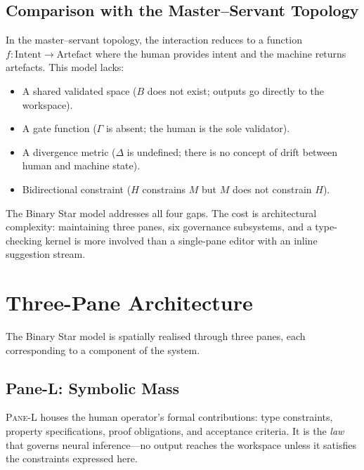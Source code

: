 \documentclass[11pt,a4paper]{article}
\newcommand{\paneL}{\textsc{Pane-L}}
\begin{document}
\subsection{Comparison with the Master--Servant Topology}

In the master--servant topology, the interaction reduces to a
function $f: \text{Intent} \to \text{Artefact}$ where the human
provides intent and the machine returns artefacts. This model
lacks:

\begin{itemize}
  \item A shared validated space ($B$ does not exist; outputs go
    directly to the workspace).
  \item A gate function ($\Gamma$ is absent; the human is the sole
    validator).
  \item A divergence metric ($\Delta$ is undefined; there is no
    concept of drift between human and machine state).
  \item Bidirectional constraint ($H$ constrains $M$ but $M$ does
    not constrain $H$).
\end{itemize}

The Binary Star model addresses all four gaps. The cost is
architectural complexity: maintaining three panes, six governance
subsystems, and a type-checking kernel is more involved than a
single-pane editor with an inline suggestion stream.

\section{Three-Pane Architecture}\label{sec:three-pane}

The Binary Star model is spatially realised through three panes,
each corresponding to a component of the system.

\subsection{Pane-L: Symbolic Mass}

\paneL{} houses the human operator's formal contributions:
type constraints, property specifications, proof obligations, and
acceptance criteria. It is the \textit{law} that governs neural
inference---no output reaches the workspace unless it satisfies
the constraints expressed here.
\end{document}
